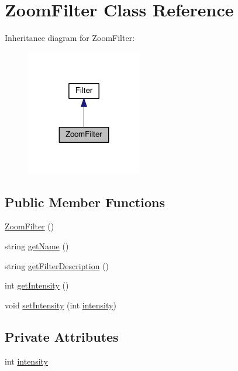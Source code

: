 \hypertarget{classModel_1_1ZoomFilter}{}\section{Zoom\+Filter Class Reference}
\label{classModel_1_1ZoomFilter}


Inheritance diagram for Zoom\+Filter\+:
\nopagebreak
\begin{figure}[H]
\begin{center}
\leavevmode
\includegraphics[width=143pt]{classModel_1_1ZoomFilter__inherit__graph}
\end{center}
\end{figure}
\subsection*{Public Member Functions}
\begin{DoxyCompactItemize}
\item 
\hyperlink{classModel_1_1ZoomFilter_a78af443c238312e85b6da4a85d2ceed3}{Zoom\+Filter} ()
\item 
string \hyperlink{classModel_1_1ZoomFilter_a11335e13e50af74108bf926dc1340b4b}{get\+Name} ()
\item 
string \hyperlink{classModel_1_1ZoomFilter_a62b7b60e24f92234393b840b35808e06}{get\+Filter\+Description} ()
\item 
int \hyperlink{classModel_1_1ZoomFilter_a708995fb1b6acb31ee0dfb0f4881e5b5}{get\+Intensity} ()
\item 
void \hyperlink{classModel_1_1ZoomFilter_ac8255ffbc46bb61acaa8fd23d0d260eb}{set\+Intensity} (int \hyperlink{classModel_1_1ZoomFilter_a299ec0c42ccc5a2d79d1739428ac3210}{intensity})
\end{DoxyCompactItemize}
\subsection*{Private Attributes}
\begin{DoxyCompactItemize}
\item 
int \hyperlink{classModel_1_1ZoomFilter_a299ec0c42ccc5a2d79d1739428ac3210}{intensity}
\end{DoxyCompactItemize}
